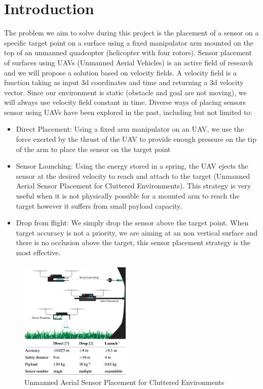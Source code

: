 \section{Introduction}




The problem we aim to solve during this project is the placement of a sensor on a specific target point on a surface using a fixed manipulator arm mounted on the top of an unmanned quadcopter (helicopter with four rotors). 
Sensor placement of surfaces using UAVs (Unmanned Aerial Vehicles) is an active field of research and we will propose a solution based on velocity fields.
A velocity field is a function taking as input 3d coordinates and time and returning a 3d velocity vector. Since our environment is static (obstacle and goal are not moving), we will always use velocity field constant in time.
Diverse ways of placing sensors sensor using UAVs have been explored in the past, including but not limited to: 
\begin{itemize}
    \item Direct Placement: Using a fixed arm manipulator on an UAV, we use the force exerted by the thrust of the UAV to provide enough pressure on the tip of the arm to place the sensor on the target point
    \item Sensor Launching: Using the energy stored in a spring, the UAV ejects the sensor at the desired velocity to reach and attach to the target (Unmanned Aerial Sensor Placement for Cluttered Environments). This strategy is very useful when it is not physically possible for a mounted arm to reach the target however it suffers from small payload capacity.
    \item Drop from flight: We simply drop the sensor above the target point. When target accuracy is not a priority, we are aiming at an non vertical surface and there is no occlusion above the target,  this sensor placement strategy is the most effective. 
\end{itemize}
\begin{figure}[h!]
    \centering
    \includegraphics[width=0.48\textwidth]{Images/threeway.png}
    \caption{Unmanned Aerial Sensor Placement for Cluttered Environments}
    \label{fig:threeway}
\end{figure}
